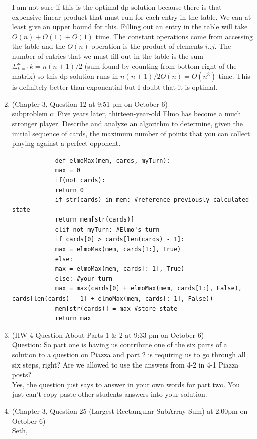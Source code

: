 \documentclass{article}
\begin{document}
\begin{enumerate}
        I am not sure if this is the optimal dp solution because there is that expensive linear product that must run for each entry in the table. We can at least give an upper bound for this. Filling out an entry in the table will take $O (n) + O(1) + O(1)$ time. The constant operations come from accessing the table and the $O(n)$ operation is the product of elements $i..j$. The number of entries that we must fill out in the table is the sum $\Sigma _{k=1}^n k = n(n+1)/2$ (sum found by counting from bottom right of the matrix) so this dp solution runs in $n(n+1)/2 O (n) = O(n^3)$ time. This is definitely better than exponential but I doubt that it is optimal.
   	\item (Chapter 3, Question 12 at 9:51 pm on October 6)\\
        	subproblem c: Five years later, thirteen-year-old Elmo has become a much stronger player. Describe and analyze an algorithm to determine, given the initial sequence of cards, the maximum number of points that you can collect playing against a perfect opponent.
        	\begin{Verbatim}
        	def elmoMax(mem, cards, myTurn):
        	max = 0
        	if(not cards):
        	return 0
        	if str(cards) in mem: #reference previously calculated state
        	return mem[str(cards)]
        	elif not myTurn: #Elmo's turn
        	if cards[0] > cards[len(cards) - 1]:
        	max = elmoMax(mem, cards[1:], True)
        	else:
        	max = elmoMax(mem, cards[:-1], True)
        	else: #your turn
        	max = max(cards[0] + elmoMax(mem, cards[1:], False), cards[len(cards) - 1] + elmoMax(mem, cards[:-1], False))
        	mem[str(cards)] = max #store state
        	return max
        	\end{Verbatim}
   
   	\item (HW 4 Question About Parts 1 & 2 at 9:33 pm on October 6)\\Question: So part one is having us 	contribute one of the six parts of a solution to a question on Piazza and part 2 is requiring us to go through all six steps, right? Are we allowed to use the answers from 4-2 in 4-1 Piazza posts? \\
        Yes, the question just says to answer in your own words for part two. You just can't copy paste other students answers into your solution.
  	\item (Chapter 3, Question 25 (Largest Rectangular SubArray Sum) at 2:00pm on October 6) \\
        Seth,
        

\end{enumerate}
\end{document}
